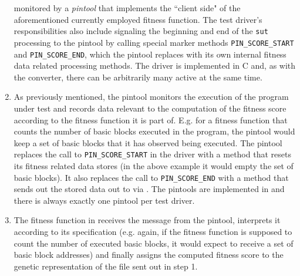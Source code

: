 \begin{enumerate}
  monitored by a \emph{pintool} that implements the ``client side" of the aforementioned currently 
  employed fitness function. The test driver's responsibilities also include signaling the beginning and end 
  of the \texttt{sut} processing to the pintool by calling special marker methods \texttt{PIN\_SCORE\_START} and
  \texttt{PIN\_SCORE\_END}, which the pintool replaces with its own internal fitness data related processing methods. 
  The driver is implemented in {\small C} and, as with the converter, there can be arbitrarily many active at the same time.
  \item As previously mentioned, the pintool monitors the execution of the program under test and records
  data relevant to the computation of the fitness score according to the fitness function it is part of.
  E.g. for a fitness function that counts the number of basic blocks executed in the program, the pintool 
  would keep a set of basic blocks that it has observed being executed. The pintool replaces the call to 
  \texttt{PIN\_SCORE\_START} in the driver with a method that resets its fitness related data stores (in the 
  above example it would empty the set of basic blocks). It also replaces the call to \texttt{PIN\_SCORE\_END} 
  with a method that sends out the stored data out to \xmlmate via \zmq. The pintools are implemented in \cpp 
  and there is always exactly one pintool per test driver.
  \item The fitness function in \xmlmate receives the message from the pintool, interprets it according to 
  its specification (e.g. again, if the fitness function is supposed to count the number of executed basic blocks, 
  it would expect to receive a set of basic block addresses) and finally assigns the computed fitness score to 
  the genetic representation of the \xml file sent out in step 1.
\end{enumerate}
